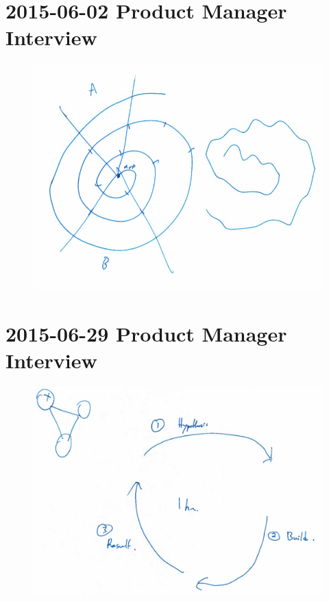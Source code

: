 \section{2015-06-02 Product Manager Interview}

\begin{figure}[h]
\centering
\includegraphics[width=6.5in]{interviews/drawings/2015_06_02.png}
\caption{}
\end{figure}

\section{2015-06-29 Product Manager Interview}

\begin{figure}[h]
\centering
\includegraphics[width=6.5in]{interviews/drawings/2015_06_29a.png}
\caption{}
\end{figure}

